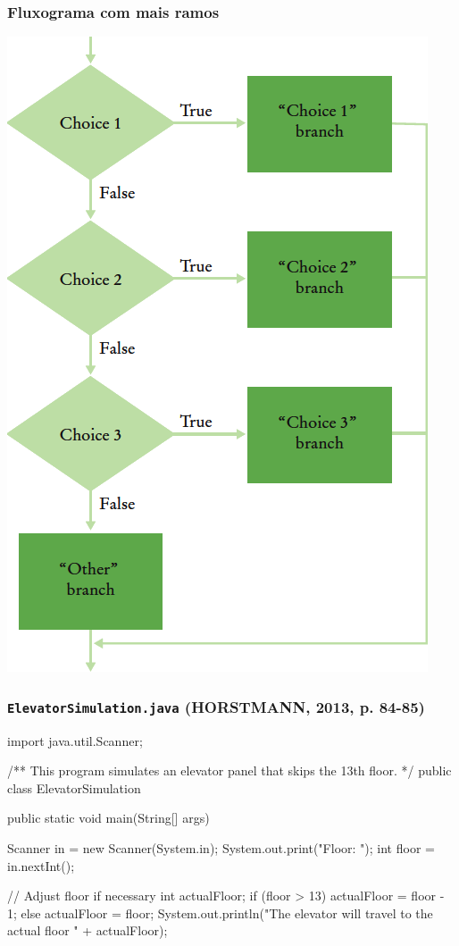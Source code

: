 \documentclass[xcolor={dvipsnames,table},aspectratio=169]{beamer}
\begin{document}
\begin{frame}\frametitle{Fluxograma com mais ramos}
\begin{center}
\includegraphics[height=0.6\paperheight]{pucrs-ep-fprog-unidade_03-decisoes-laminas-if_com_varios_ramos.png}
\end{center}
\end{frame}

\begin{frame}[fragile]\frametitle{\texttt{ElevatorSimulation.java} {\tiny (HORSTMANN, 2013, p. 84-85)}}
{\tiny
\begin{javacode}
import java.util.Scanner;

/**
   This program simulates an elevator panel that skips the 13th floor.
*/
public class ElevatorSimulation {
   public static void main(String[] args) {
      Scanner in = new Scanner(System.in);
      System.out.print("Floor: ");
      int floor = in.nextInt();

      // Adjust floor if necessary
      int actualFloor;
      if (floor > 13) {
         actualFloor = floor - 1;
      }
      else {
         actualFloor = floor;
      }
      System.out.println("The elevator will travel to the actual floor " + actualFloor);
   }
}
\end{javacode}
}
\end{frame}
\end{document}
